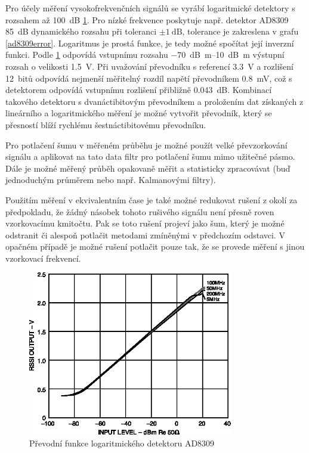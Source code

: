 Pro účely měření vysokofrekvenčních signálů se vyrábí logaritmické detektory s rozsahem až \SI{100}{\deci\bel} \cite{AD8309datasheet} \ref{ad8309function}. Pro nízké frekvence poskytuje např. detektor AD8309 \SI{85}{\deci\bel} dynamického rozsahu při toleranci $\pm \SI{1}{\deci\bel}$, tolerance je zakreslena v grafu \ref{ad8309error}. Logaritmus je prostá funkce, je tedy možné spočítat její inverzní funkci. Podle \ref{ad8309function} odpovídá vstupnímu rozsahu \SIrange{-70}{10}{\deci\bel m} výstupní rozsah o velikosti \SI{1.5}{\volt}. Při uvažování převodníku s referencí \SI{3.3}{\volt} a rozlišení 12~bitů odpovídá nejmenší měřitelný rozdíl napětí převodníkem \SI{0.8}{\milli\volt}, což s detektorem odpovídá vstupnímu rozlišení přibližně \SI{0.043}{\deci\bel}. Kombinací takového detektoru s dvanáctibitovým převodníkem a proložením dat získaných z lineárního a logaritmického měření je možné vytvořit převodník, který se přesností blíží rychlému šestnáctibitovému převodníku.

Pro potlačení šumu v měřeném průběhu je možné použít velké převzorkování signálu a aplikovat na tato data filtr pro potlačení šumu mimo užitečné pásmo. Dále je možné měřený průběh opakovaně měřit a statisticky zpracovávat (buď jednoduchým průměrem nebo např. Kalmanovými filtry).

Použitím měření v ekvivalentním čase je také možné redukovat rušení z okolí za předpokladu, že žádný násobek tohoto rušivého signálu není přesně roven vzorkovacímu kmitočtu. Pak se toto rušení projeví jako šum, který je možné odstranit či alespoň potlačit metodami zmíněnými v předchozím odstavci. V opačném případě je možné rušení potlačit pouze tak, že se provede měření s jinou vzorkovací frekvencí.

\begin{figure}[htbp]\includegraphics[width=0.8\textwidth,keepaspectratio]{images/AD8309_function.eps}\caption{Převodní funkce logaritmického detektoru AD8309 \cite{AD8309datasheet}}\label{ad8309function}\end{figure}	

